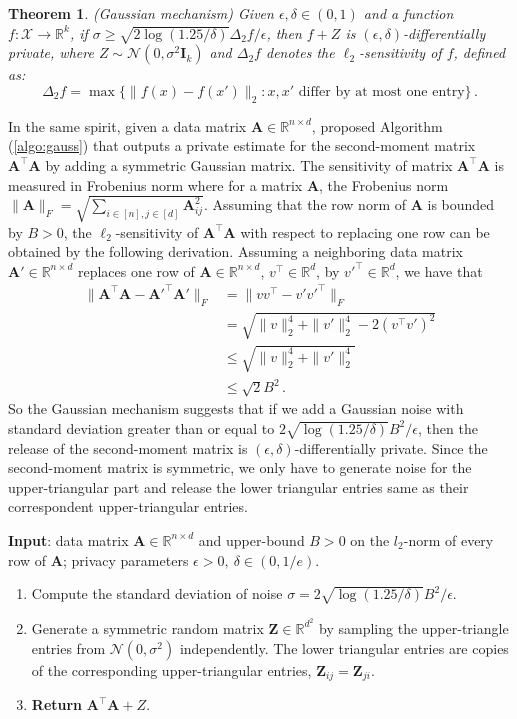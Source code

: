\documentclass[11pt]{article}
\newtheorem{theorem}{Theorem}%
\newcommand{\bI}{\boldsymbol{I}}
\newcommand{\bA}{\boldsymbol{A}}
\newcommand{\bZ}{\boldsymbol{Z}}
\newcommand{\mbR}{\mathbb{R}}
\newcommand{\mcN}{\mathcal{N}}
\begin{document}
\begin{theorem}
    (Gaussian mechanism) Given $\epsilon,\delta\in(0,1)$ and a function $f:\mathcal{X}\to\mbR^k$, if $\sigma\geq \sqrt{2\log(1.25/\delta)}\Delta_2f/\epsilon$, then $f+Z$ is $(\epsilon,\delta)$-differentially private, where $Z\sim\mcN(0,\sigma^2\bI_k)$ and $\Delta_2f$ denotes the $\ell_2$-sensitivity of $f$, defined as:
    \[
    \Delta_2f = \max\{\|f(x)-f(x')\|_2:x,x'\text{ differ by at most one entry}\}\,.
    \]
\end{theorem}
In the same spirit, given a data matrix $\bA\in\mbR^{n\times d}$, \cite{analyzegauss} proposed Algorithm (\ref{algo:gauss}) that outputs a private estimate for the second-moment matrix $\bA^\top \bA$ by adding a symmetric Gaussian matrix. The sensitivity of matrix $\bA^\top \bA$ is measured in Frobenius norm where for a matrix $\bA$, the Frobenius norm $\|\bA\|_F = \sqrt{\sum_{i\in[n],j\in[d]}\bA_{ij}^2}$. Assuming that the row norm of $\bA$ is bounded by $B>0$, the $\ell_2$-sensitivity of $\bA^\top\bA$ with respect to replacing one row can be obtained by the following derivation. Assuming a neighboring data matrix $\bA'\in\mbR^{n\times d}$ replaces one row of $\bA\in\mbR^{n\times d}$, $v^\top\in\mbR^d$, by $v'^\top\in\mbR^d$, we have that 
\begin{align*}
    \|\bA^\top \bA - \bA'^\top\bA'\|_F&=\|vv^\top-v'v'^\top\|_F\\
        &= \sqrt{\|v\|_2^4+\|v'\|_2^4-2(v^\top v')^2}\\
        &\le \sqrt{\|v\|_2^4+\|v'\|_2^4}\\
        &\leq \sqrt{2}B^2\,.
\end{align*}
So the Gaussian mechanism suggests that if we add a Gaussian noise with standard deviation greater than or equal to $2\sqrt{\log(1.25/\delta)}B^2/\epsilon$, then the release of the second-moment matrix is $(\epsilon, \delta)$-differentially private. Since the second-moment matrix is symmetric, we only have to generate noise for the upper-triangular part and release the lower triangular entries same as their correspondent upper-triangular entries.

\begin{algorithm}\label{algo:gauss}
    \caption{Gaussian Mechanism for Second-Moment Matrix \citep{analyzegauss}}
    \textbf{Input}: data matrix $\bA\in \mathbb{R}^{n\times d}$ and upper-bound $B>0$ on the $l_2$-norm of every row of $\bA$; privacy parameters $\epsilon>0,\ \delta\in(0,1/e)$.
    \begin{enumerate}
        \item Compute the standard deviation of noise $\sigma = 2\sqrt{\log(1.25/\delta)}B^2/\epsilon$.
        \item Generate a symmetric random matrix $\bZ\in\mbR^{d^2}$ by sampling the upper-triangle entries from $\mcN(0,\sigma^2)$ independently. The lower triangular entries are copies of the corresponding upper-triangular entries, $\bZ_{ij} = \bZ_{ji}$.  
        \item \textbf{Return} $\bA^\top\bA+Z$.
    \end{enumerate}
\end{algorithm}
\end{document}
